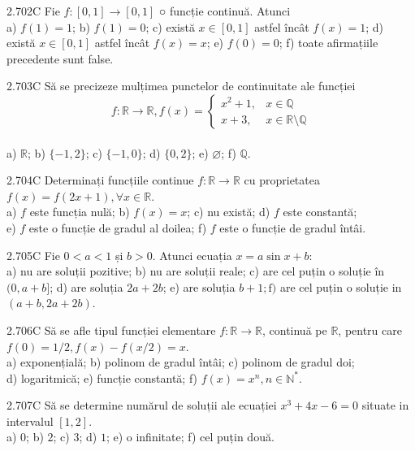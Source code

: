 \documentclass[11pt]{article}
\begin{document}
2.702C Fie $f:[0,1] \rightarrow[0,1]$ ○ funcție continuă. Atunci\\ a) $f(1)=1$; b) $f(1)=0$; c) există $x \in[0,1]$ astfel încât $f(x)=1$; d) există $x \in[0,1]$ astfel încât $f(x)=x$; e) $f(0)=0$; f) toate afirmațiile precedente sunt false.

2.703C Să se precizeze mulțimea punctelor de continuitate ale funcției $$f: \mathbb{R} \rightarrow \mathbb{R}, f(x)= \begin{cases}x^{2}+1, & x \in \mathbb{Q} \\ x+3, & x \in \mathbb{R} \setminus \mathbb{Q}\end{cases}$$\\ a) $\mathbb{R}$; b) $\{-1,2\}$; c) $\{-1,0\}$; d) $\{0,2\}$; e) $\varnothing$; f) $\mathbb{Q}$.

2.704C Determinați funcțiile continue $f: \mathbb{R} \longrightarrow \mathbb{R}$ cu proprietatea $f(x)=f(2 x+1), \forall x \in \mathbb{R}$.\\ a) $f$ este funcția nulă; b) $f(x)=x$; c) nu există; d) $f$ este constantă;\\ e) $f$ este o funcție de gradul al doilea; f) $f$ este o funcție de gradul întâi.

2.705C Fie $0<a<1$ și $b>0$. Atunci ecuația $x=a \sin x+b$:\\ a) nu are soluții pozitive; b) nu are soluții reale; c) are cel puțin o soluție în $(0, a+b]$; d) are soluția $2 a+2 b$; e) are soluția $b+1 ; \mathrm{f})$ are cel puțin o soluție in $(a+b, 2 a+2 b)$.

2.706C Să se afle tipul funcției elementare $f: \mathbb{R} \rightarrow \mathbb{R}$, continuă pe $\mathbb{R}$, pentru care $f(0)=1 / 2, f(x)-f(x / 2)=x$.\\ a) exponențială; b) polinom de gradul întâi; c) polinom de gradul doi;\\ d) logaritmică; e) funcție constantă; f) $f(x)=x^{n}, n \in \mathbb{N}^{*}$.

2.707C Să se determine numărul de soluții ale ecuației $x^{3}+4 x-6=0$ situate in intervalul $[1,2]$.\\ a) $0$; b) $2$; c) $3$; d) $1$; e) o infinitate; f) cel puțin două.
\end{document}
